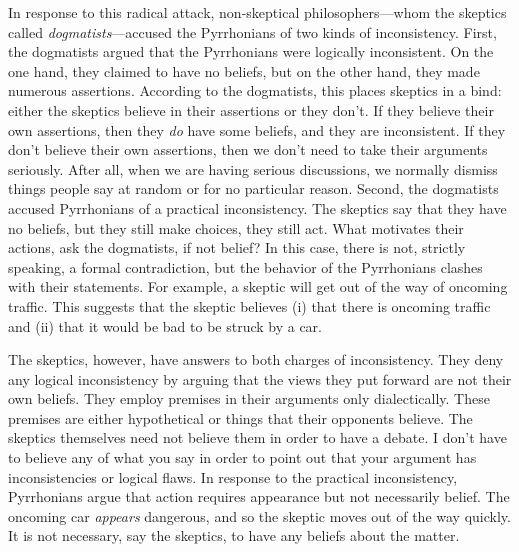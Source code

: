 In response to this radical attack, non-skeptical philosophers---whom the skeptics called \textit{dogmatists}---accused the Pyrrhonians of two kinds of inconsistency. First, the dogmatists argued that the Pyrrhonians were logically inconsistent. On the one hand, they claimed to have no beliefs, but on the other hand, they made numerous assertions. According to the dogmatists, this places skeptics in a bind: either the skeptics believe in their assertions or they don't. If they believe their own assertions, then they \textit{do} have some beliefs, and they are inconsistent. If they don't believe their own assertions, then we don't need to take their arguments seriously. After all, when we are having serious discussions, we normally dismiss things people say at random or for no particular reason. Second, the dogmatists accused Pyrrhonians of a practical inconsistency. The skeptics say that they have no beliefs, but they still make choices, they still act. What motivates their actions, ask the dogmatists, if not belief? In this case, there is not, strictly speaking, a formal contradiction, but the behavior of the Pyrrhonians clashes with their statements. For example, a skeptic will get out of the way of oncoming traffic. This suggests that the skeptic believes (i) that there is oncoming traffic and (ii) that it would be bad to be struck by a car.

The skeptics, however, have answers to both charges of inconsistency. They deny any logical inconsistency by arguing that the views they put forward are not their own beliefs. They employ premises in their arguments only dialectically. These premises are either hypothetical or things that their opponents believe. The skeptics themselves need not believe them in order to have a debate. I don't have to believe any of what you say in order to point out that your argument has inconsistencies or logical flaws. In response to the practical inconsistency, Pyrrhonians argue that action requires appearance but not necessarily belief. The oncoming car \textit{appears} dangerous, and so the skeptic moves out of the way quickly. It is not necessary, say the skeptics, to have any beliefs about the matter.

